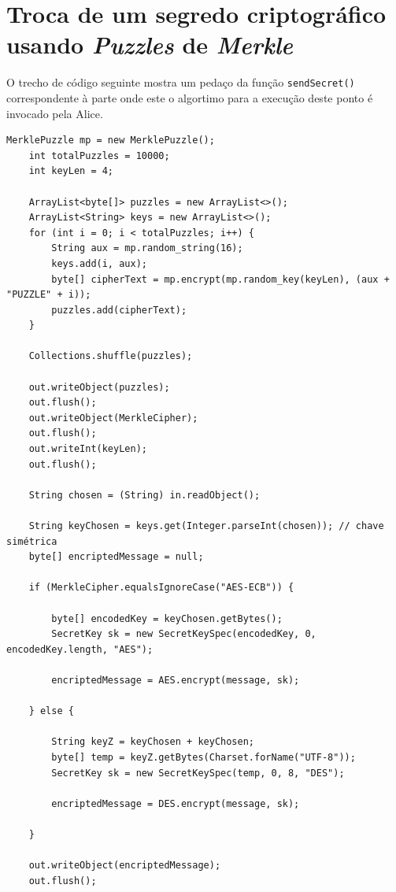 \newline\section{Troca de um segredo criptográfico usando \textit{Puzzles} de \textit{Merkle}}
\label{chap4:sec:merkle}

O trecho de código seguinte mostra um pedaço da função \texttt{sendSecret()} correspondente à parte onde este o algortimo para a execução deste ponto é invocado pela Alice. 

\begin{lstlisting}[caption=Trecho de código usado no projeto.]
    MerklePuzzle mp = new MerklePuzzle();
    int totalPuzzles = 10000;
    int keyLen = 4;
    
    ArrayList<byte[]> puzzles = new ArrayList<>();
    ArrayList<String> keys = new ArrayList<>();
    for (int i = 0; i < totalPuzzles; i++) {
        String aux = mp.random_string(16);
        keys.add(i, aux);
        byte[] cipherText = mp.encrypt(mp.random_key(keyLen), (aux + "PUZZLE" + i));
        puzzles.add(cipherText);
    }
    
    Collections.shuffle(puzzles);
    
    out.writeObject(puzzles);
    out.flush();
    out.writeObject(MerkleCipher);
    out.flush();
    out.writeInt(keyLen);
    out.flush();
    
    String chosen = (String) in.readObject();
    
    String keyChosen = keys.get(Integer.parseInt(chosen)); // chave simétrica
    byte[] encriptedMessage = null;
    
    if (MerkleCipher.equalsIgnoreCase("AES-ECB")) {
        
        byte[] encodedKey = keyChosen.getBytes();
        SecretKey sk = new SecretKeySpec(encodedKey, 0, encodedKey.length, "AES");
    
        encriptedMessage = AES.encrypt(message, sk);
        
    } else {
        
        String keyZ = keyChosen + keyChosen;
        byte[] temp = keyZ.getBytes(Charset.forName("UTF-8"));
        SecretKey sk = new SecretKeySpec(temp, 0, 8, "DES");
        
        encriptedMessage = DES.encrypt(message, sk);
        
    }
    
    out.writeObject(encriptedMessage);
    out.flush();
\end{lstlisting}
